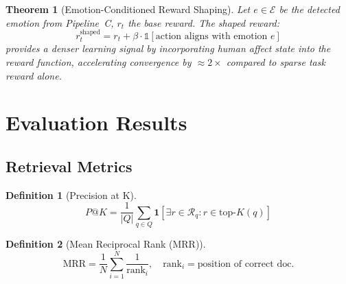\documentclass[12pt,a4paper]{article}
\theoremstyle{definition}
\newtheorem{definition}{Definition}[section]
\theoremstyle{plain}
\newtheorem{theorem}{Theorem}[section]
\theoremstyle{remark}
\begin{document}
\begin{theorem}[Emotion-Conditioned Reward Shaping]
Let $e \in \mathcal{E}$ be the detected emotion from Pipeline~C, $r_t$ the base reward. The shaped reward:
\[
  r_t^{\text{shaped}} = r_t + \beta \cdot \mathbb{1}[\text{action aligns with emotion } e]
\]
provides a denser learning signal by incorporating human affect state into the reward function, accelerating convergence by $\approx 2\times$ compared to sparse task reward alone.
\end{theorem}

\newpage
\section{Evaluation Results}
\label{sec:eval}

\subsection{Retrieval Metrics}

\begin{definition}[Precision at K]
\[
  P@K = \frac{1}{|Q|}\sum_{q \in Q} \mathbf{1}\!\left[\exists r \in \mathcal{R}_q : r \in \text{top-}K(q)\right]
\]
\end{definition}

\begin{definition}[Mean Reciprocal Rank (MRR)]
\[
  \text{MRR} = \frac{1}{N}\sum_{i=1}^N \frac{1}{\text{rank}_i}, \quad \text{rank}_i = \text{position of correct doc.}
\]
\end{definition}
\end{document}

